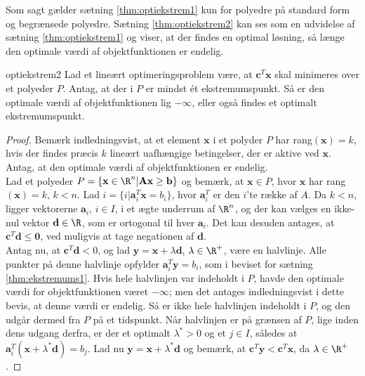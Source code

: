 %
%
%
Som sagt gælder sætning \ref{thm:optiekstrem1} kun for polyedre på standard form og begrænsede polyedre. 
Sætning \ref{thm:optiekstrem2} kan ses som en udvidelse af sætning \ref{thm:optiekstrem1} og viser, at der findes en optimal løsning, så længe den optimale værdi af objektfunktionen er endelig. 
\begin{thm}{}{optiekstrem2}
Lad et lineært optimeringsproblem være, at $\textbf{c}^T \textbf{x}$ skal minimeres over et polyeder $P$. 
Antag, at der i $P$ er mindst ét ekstremumspunkt. 
Så er den optimale værdi af objektfunktionen lig $- \infty$, eller også findes et optimalt ekstremumspunkt. 
\end{thm}
%
\begin{proof}
Bemærk indledningsvist, at et element $\textbf{x}$ i et polyder $P$ har rang$(\textbf{x})=k$, hvis der findes præcis $k$ lineært uafhængige betingelser, der er aktive ved $\textbf{x}$. 
Antag, at den optimale værdi af objektfunktionen er endelig. \\
Lad et polyeder $P = \{\textbf{x} \in \R^n | \textbf{A}\textbf{x} \geq \textbf{b} \}$ og bemærk, at $\textbf{x} \in P$, hvor $\textbf{x}$ har rang$(\textbf{x})=k$, $k < n$. 
Lad $i = \{ i | \textbf{a}^T_i \textbf{x} = b_i \}$, hvor $\textbf{a}^T_i$ er den $i$'te række af $A$. 
Da $k < n$, ligger vektorerne $\textbf{a}_i$, $i \in I$, i et ægte underrum af $ \R^n$, og der kan vælges en ikke-nul vektor $\textbf{d} \in \R$, som er ortogonal til hver $\textbf{a}_i$. 
Det kan desuden antages, at $\textbf{c}^T \textbf{d} \leq \textbf{0}$, ved muligvis at tage negationen af $\textbf{d}$. \\
Antag nu, at $\textbf{c}^T \textbf{d} < 0$, og lad $\textbf{y} = \textbf{x} + \lambda \textbf{d}$, $ \lambda \in \R^+$, være en halvlinje. 
Alle punkter på denne halvlinje opfylder $\textbf{a}^T_i \textbf{y} = b_i$, som i beviset for sætning \ref{thm:ekstremums1}. 
Hvis hele halvlinjen var indeholdt i $P$, havde den optimale værdi for objektfunktionen været $- \infty $; men det antages indledningsvist i dette bevis, at denne værdi er endelig. 
Så er ikke hele halvlinjen indeholdt i $P$, og den udgår dermed fra $P$ på et tidspunkt. 
Når halvlinjen er på grænsen af $P$, lige inden dens udgang derfra, er der et optimalt $ \lambda^* > 0$ og et $j \in I$, således at $\textbf{a}^T_i (\textbf{x} + \lambda^* \textbf{d} ) = b_j $.
Lad nu $\textbf{y} = \textbf{x} + \lambda^* \textbf{d} $ og bemærk, at $ \textbf{c}^T \textbf{y} < \textbf{c}^T \textbf{x}$, da $ \lambda \in \R^+ $. 

\end{proof}
